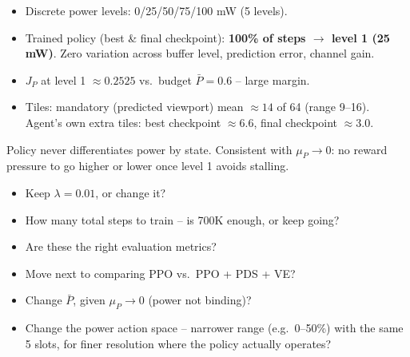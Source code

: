 \documentclass[aspectratio=169]{beamer}
\newcommand{\Pbar}{\bar P}
\begin{document}
\begin{frame}
\begin{itemize}
  \item Discrete power levels: 0/25/50/75/100 mW (5 levels).
  \item Trained policy (best \& final checkpoint): \textbf{100\% of steps $\to$ level 1 (25 mW)}. Zero variation across buffer level, prediction error, channel gain.
  \item $J_P$ at level 1 $\approx0.2525$ vs.\ budget $\Pbar=0.6$ -- large margin.
  \item Tiles: mandatory (predicted viewport) mean $\approx14$ of 64 (range 9--16). Agent's own extra tiles: best checkpoint $\approx6.6$, final checkpoint $\approx3.0$.
\end{itemize}
\vspace{6pt}
\footnotesize Policy never differentiates power by state. Consistent with $\mu_P\to0$: no reward pressure to go higher or lower once level 1 avoids stalling.
\end{frame}

\begin{frame}
\begin{itemize}
  \item Keep $\lambda=0.01$, or change it?
  \item How many total steps to train -- is 700K enough, or keep going?
  \item Are these the right evaluation metrics?
  \item Move next to comparing PPO vs.\ PPO + PDS + VE?
  \item Change $\Pbar$, given $\mu_P\to0$ (power not binding)?
  \item Change the power action space -- narrower range (e.g.\ 0--50\%) with the same 5 slots, for finer resolution where the policy actually operates?
\end{itemize}
\end{frame}
\end{document}
